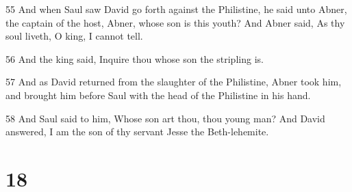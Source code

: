 \par 55 And when Saul saw David go forth against the Philistine, he said unto Abner, the captain of the host, Abner, whose son is this youth? And Abner said, As thy soul liveth, O king, I cannot tell.
\par 56 And the king said, Inquire thou whose son the stripling is.
\par 57 And as David returned from the slaughter of the Philistine, Abner took him, and brought him before Saul with the head of the Philistine in his hand.
\par 58 And Saul said to him, Whose son art thou, thou young man? And David answered, I am the son of thy servant Jesse the Beth-lehemite.

\chapter{18}


